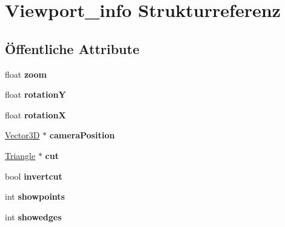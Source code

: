 \hypertarget{structViewport__info}{\section{Viewport\-\_\-info Strukturreferenz}
\label{structViewport__info}
}
\subsection*{Öffentliche Attribute}
\begin{DoxyCompactItemize}
\item 
\hypertarget{structViewport__info_aeab04026de344848e9807094afb36e84}{float {\bfseries zoom}}\label{structViewport__info_aeab04026de344848e9807094afb36e84}

\item 
\hypertarget{structViewport__info_a64e7b7cbf114ec543ead86d91b26756a}{float {\bfseries rotation\-Y}}\label{structViewport__info_a64e7b7cbf114ec543ead86d91b26756a}

\item 
\hypertarget{structViewport__info_afeb27795d292ca2e7e9c6e798c277f5f}{float {\bfseries rotation\-X}}\label{structViewport__info_afeb27795d292ca2e7e9c6e798c277f5f}

\item 
\hypertarget{structViewport__info_ab27fd89845fd0c1b44aff82f53363f69}{\hyperlink{classVector3D}{Vector3\-D} $\ast$ {\bfseries camera\-Position}}\label{structViewport__info_ab27fd89845fd0c1b44aff82f53363f69}

\item 
\hypertarget{structViewport__info_a596f5507aa67421be19f2329df2b3246}{\hyperlink{classTriangle}{Triangle} $\ast$ {\bfseries cut}}\label{structViewport__info_a596f5507aa67421be19f2329df2b3246}

\item 
\hypertarget{structViewport__info_aeea9e12a7744c9462e250b9608b32710}{bool {\bfseries invertcut}}\label{structViewport__info_aeea9e12a7744c9462e250b9608b32710}

\item 
\hypertarget{structViewport__info_ac00c67cbaa72f5cfd1cc82341d3e2951}{int {\bfseries showpoints}}\label{structViewport__info_ac00c67cbaa72f5cfd1cc82341d3e2951}

\item 
\hypertarget{structViewport__info_ad56a2b77ce993319976fd610b765a136}{int {\bfseries showedges}}\label{structViewport__info_ad56a2b77ce993319976fd610b765a136}


\end{DoxyCompactItemize}
